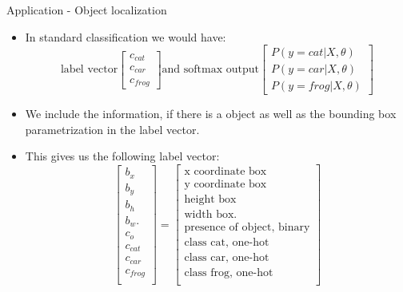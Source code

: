 \documentclass[11pt,compress,t,notes=noshow, xcolor=table]{beamer}
\begin{document}
\begin{vbframe}{Application - Object localization}
\begin{itemize}
            \item In standard classification we would have: 
                $$
                \text{label vector}
            \begin{bmatrix}
            c_{cat}\\
            c_{car} \\
            c_{frog}
            \end{bmatrix}
            \text{and softmax output}
            \begin{bmatrix}
            P(y = cat| X, \theta)\\
            P(y = car| X, \theta)\\
            P(y = frog| X, \theta)
            \end{bmatrix}
            $$
                \end{itemize}
            \framebreak
            \begin{itemize}
            \item We include the information, if there is a object as well as the bounding box parametrization in the label vector.
            \item This gives us the following label vector:
                $$
                \begin{bmatrix}
            b_x\\
            b_y \\
            b_h \\
            b_w.\\
            c_o \\
            c_{cat} \\
            c_{car} \\
            c_{frog} \\
            \end{bmatrix} =             
                \begin{bmatrix}
            \text{x coordinate box}\\
            \text{y coordinate box} \\
            \text{height box} \\
            \text{width box}.\\
            \text{presence of object, binary} \\
            \text{class cat, one-hot} \\
            \text{class car, one-hot}\\
            \text{class frog, one-hot} \\

\end{bmatrix}$$
\end{itemize}
\end{vbframe}
\end{document}

